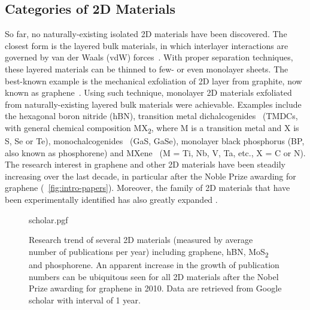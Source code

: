

\subsection{Categories of 2D Materials}
\label{sec:categ-2d-mater}

So far, no naturally-existing isolated 2D
materials have been discovered.
%
The closest form is the layered bulk materials, in which interlayer
interactions are governed by van der Waals (vdW)
forces~.
%
With proper separation techniques, these layered materials can be
thinned to few- or even mono\-layer sheets.
%
The best-known example is the mechanical exfoliation of 2D layer from graphite,
now known as graphene~\cite{Novoselov_2004_gr}.
%
Using such technique, mono\-layer 2D materials exfoliated from naturally-existing
layered bulk materials were achievable.
%
Examples include the hexagonal boron
nitride\cite{Cavar_2008_hBN_Pt,Gorbachev_2011_BN_monolayer} (hBN), transition metal
dichalcogenides~\cite{Mak_2010_mos2} (TMDCs, with general chemical
composition MX\textsubscript{2}, where M is a transition metal and X
is S, Se or Te), monochalcogenides~\cite{Late_2012_GaS} (GaS, GaSe),
monolayer black phosphorus\cite{Li_2014_BP,Liu_2014_BP} (BP, also
known as phosphorene) and MXene~\cite{Naguib_2011_Mxene} (M = Ti, Nb,
V, Ta, etc., X = C or N).
%
The research interest in graphene and other 2D materials have been
steadily increasing over the last decade, in particular after the
Noble Prize awarding for graphene (~\autoref{fig:intro-papers}).
%
Moreover, the family of 2D materials that have been experimentally
identified has also greatly expanded
\cite{Bhimanapati_2015_2D_rev,Mannix_2017}.

\begin{figure}[htbp]
  \centering
  {scholar.pgf}
  \caption{\label{fig:intro-papers} %
    Research trend of several 2D materials (measured by average number
    of publications per year) including graphene, hBN,
    MoS\textsubscript{2} and phosphorene.  An apparent increase in the
    growth of publication numbers can be ubiquitous seen for all 2D
    materials after the Nobel Prize awarding for graphene in 2010.
    Data are retrieved from Google scholar with interval of 1
    year. }
\end{figure}

